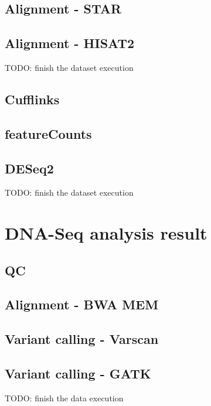 \subsection{Alignment - STAR}

\subsection{Alignment - HISAT2}

TODO: finish the dataset execution

\subsection{Cufflinks}

\subsection{featureCounts}

\subsection{DESeq2}

TODO: finish the dataset execution


\section{DNA-Seq analysis result}

\subsection{QC}

\subsection{Alignment - BWA MEM}

\subsection{Variant calling - Varscan}

\subsection{Variant calling - GATK}

TODO: finish the data execution



